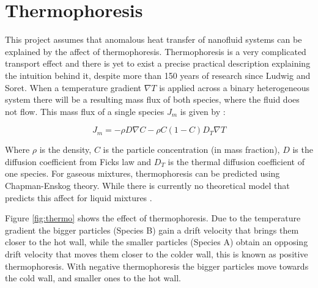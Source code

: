 \documentclass[12pt,MEng]{UoAThesis}
\begin{document}
\section{Thermophoresis}
This project assumes that anomalous heat transfer of nanofluid systems can be explained by the affect of thermophoresis. Thermophoresis is a very complicated transport effect and there is yet to exist a precise practical description explaining the intuition behind it, despite more than 150 years of research since Ludwig and Soret. When a temperature gradient $\nabla T$ is applied across a binary heterogeneous system there will be a resulting mass flux of both species, where the fluid does not flow. This mass flux of a single species  $J_m$ is given by \cite{sovet2004}:

\begin{equation}
J_m = - \rho D \nabla C - \rho C (1 - C) D_T \nabla T
\end{equation} 

\noindent Where $\rho$ is the density, $C$ is the particle concentration (in mass fraction), $D$ is the diffusion coefficient from Ficks law and $D_T$ is the thermal diffusion coefficient of one species. For gaseous mixtures, thermophoresis can be predicted using Chapman-Enskog theory. While there is currently no theoretical model that predicts this affect for liquid mixtures \cite{sovet2004}.

Figure \ref{fig:thermo} shows the effect of thermophoresis. Due to the temperature gradient the bigger particles (Species B) gain a drift velocity that brings them closer to the hot wall, while the smaller particles (Species A) obtain an opposing drift velocity that moves them closer to the colder wall, this is known as positive thermophoresis. With negative thermophoresis the bigger particles move towards the cold wall, and smaller ones to the hot wall.
\end{document}
